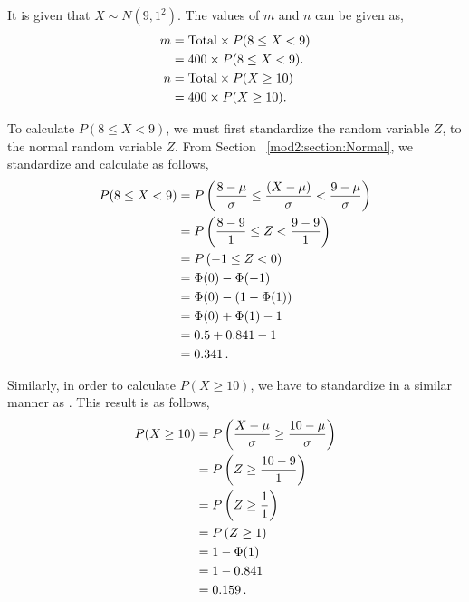 \begin{subquestions}
\subquestion

\begin{subsubquestions}
	
\subsubquestion

It is given that $X \sim N(9,1^2)$. The values of $m$ and $n$ can be given as,
\begin{align}
	m & = \text{Total} \times P(8 \leq X < 9) \nonumber \\
	  & = 400 \times P(8 \leq X < 9). \nonumber \\
    n & = \text{Total} \times P(X \geq 10) \nonumber \\
      & = 400 \times P(X \geq 10). \label{2015:q4:MNeqn}
\end{align}
	
To calculate $P(8 \leq X < 9)$, we must first standardize the random variable $Z$, to the normal random variable $Z$. From Section ~\ref{mod2:section:Normal}, we standardize and calculate as follows,
\begin{align}
	P(8 \leq X < 9) & = P\left(\frac{8- \mu}{\sigma} \leq \frac{(X-\mu)}{\sigma} < \frac{9-\mu}{\sigma} \right) \nonumber \\
	                & = P\left(\frac{8- 9}{1} \leq Z < \frac{9-9}{1} \right) \nonumber \\
	                & = P\left(-1 \leq Z < 0 \right) \nonumber \\
	                & = \Phi(0) - \Phi(-1) \nonumber \\
	                & = \Phi(0) - (1 - \Phi(1)) \nonumber \\
	                & = \Phi(0) + \Phi(1) - 1 \nonumber \\
	                & = 0.5 + 0.841 - 1 \nonumber \\
	                & = 0.341 \,. \label{2015:q4:Normal1}
\end{align}

Similarly, in order to calculate $P(X \geq 10)$, we have to standardize in a similar manner as . This result is as follows,
\begin{align}
	P(X \geq 10) & = P\left(\frac{X-\mu}{\sigma} \geq \frac{10 - \mu}{\sigma} \right) \nonumber \\
	             & = P\left(Z \geq \frac{10-9}{1}\right) \nonumber \\
	             & = P\left(Z \geq \frac{1}{1}\right) \nonumber \\
	             & = P\left(Z \geq 1\right) \nonumber \\
	             & = 1 - \Phi(1) \nonumber \\
	             & = 1 - 0.841 \nonumber \\
	             & = 0.159 \,. \label{2015:q4:Normal2}
\end{align}


\end{subsubquestions}
\end{subquestions}
